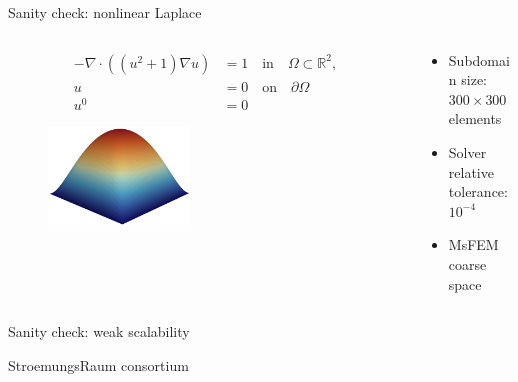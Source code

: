 \begin{frame}[noframenumbering]{Sanity check: nonlinear Laplace}
	\begin{columns}
		\begin{column}{0.47\textwidth}
			\begin{align*}
				-\nabla\cdot((u^2+1)\nabla u) & =1\quad \text{in}\quad \Omega\subset\mathbb{R}^2, \\
				u                             & = 0\quad\text{on}\quad\partial\Omega              \\
				u^0                           & = 0
			\end{align*}
			\begin{figure}
				\centering
				\includegraphics[width=0.45\textwidth]{images/laplace}
			\end{figure}
		\end{column}
		\begin{column}{0.53\textwidth}
			\begin{itemize}
				\setlength{\itemsep}{10pt}
				\item Subdomain size: $300\times300$ elements
				\item Solver relative tolerance: $10^{-4}$
				\item MsFEM coarse space
			\end{itemize}
		\end{column}
	\end{columns}
\end{frame}

\begin{frame}[noframenumbering]{Sanity check: weak scalability}
	\begin{figure}
		\centering
		
	\end{figure}
\end{frame}

\begin{frame}[noframenumbering]{StroemungsRaum consortium}
	\begin{figure}
		\centering
		
	\end{figure}
\end{frame}

